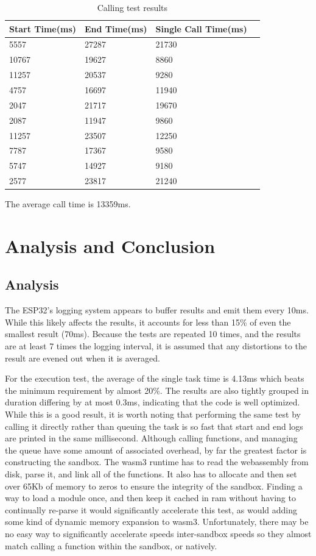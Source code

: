 \documentclass{article}
\begin{document}
\begin{enumerate}
\begin{table}[H]
\begin{tabular}{|l|l|l|l|}
\hline
Start Time(ms)		&End Time(ms)				&Single Call Time(ms)\\ \hline
5557	 & 27287	 & 21730\\ \hline
10767	 & 19627	 & 8860\\ \hline
11257	 & 20537	 & 9280\\ \hline
4757	 & 16697	 & 11940\\ \hline
2047	 & 21717	 & 19670\\ \hline
2087	 & 11947	 & 9860\\ \hline
11257	 & 23507	 & 12250\\ \hline
7787	 & 17367	 & 9580\\ \hline
5747	 & 14927	 & 9180\\ \hline
2577	 & 23817	 & 21240\\ \hline
\end{tabular}
\caption{Calling test results}
\end{table}

The average call time is 13359ms.

\end{enumerate}


\section{Analysis and Conclusion}
\subsection{Analysis}
The ESP32's logging system appears to buffer results and emit them every 10ms. While this likely affects the results, it accounts for less than 15\% of even the smallest result (70ms). Because the tests are repeated 10 times, and the results are at least 7 times the logging interval, it is assumed that any distortions to the result are evened out when it is averaged.

For the execution test, the average of the single task time is 4.13ms which beats the minimum requirement by almost 20\%. The results are also tightly grouped in duration differing by at most 0.3ms, indicating that the code is well optimized. While this is a good result, it is worth noting that performing the same test by calling it directly rather than queuing the task is so fast that start and end logs are printed in the same millisecond. Although calling functions, and managing the queue have some amount of associated overhead, by far the greatest factor is constructing the sandbox. The wasm3 runtime has to read the webassembly from disk, parse it, and link all of the functions. It also has to allocate and then set over 65Kb of memory to zeros to ensure the integrity of the sandbox. Finding a way to load a module once, and then keep it cached in ram without having to continually re-parse it would significantly accelerate this test, as would adding some kind of dynamic memory expansion to wasm3. Unfortunately, there may be no easy way to significantly accelerate speeds inter-sandbox speeds so they almost match calling a function within the sandbox, or natively.
\end{document}
